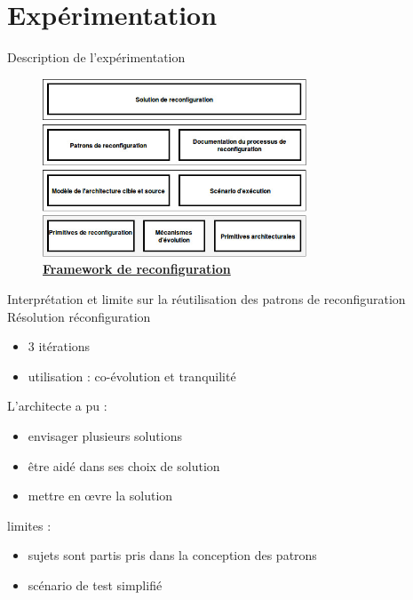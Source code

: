 \section{Expérimentation}
\begin{frame}{Description de l'expérimentation}
\begin{figure}
\includegraphics[width=0.7\textwidth]{imgs/framework}
\caption{\underline{\textbf{Framework de reconfiguration}}}
\end{figure}    
\end{frame}


\begin{frame}{Interprétation et limite sur la réutilisation des
patrons de reconfiguration}
Résolution réconfiguration 
\begin{itemize}
\item 3 itérations
\item utilisation : co-évolution et tranquilité
\end{itemize}

L'architecte a pu :
\begin{itemize}
\item envisager plusieurs solutions
\item être aidé dans ses choix de solution
\item mettre en \oe{}vre la solution
\end{itemize}

limites : 
\begin{itemize}
\item sujets sont partis pris dans la conception des patrons
\item scénario de test simplifié
\end{itemize}

\end{frame}
